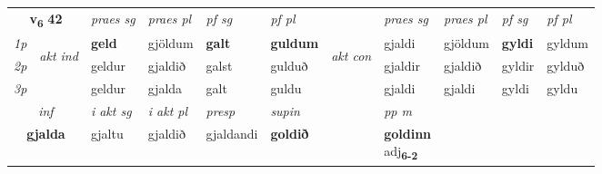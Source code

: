 \noindent
\begin{tabular}{lllllllllll} \toprule
\multicolumn{2}{c}{\textbf{v{\textsubscript{6}}} \Large{\textbf{42}}}  &  \textit{praes sg}  & \textit{praes pl}  &\textit{ pf sg} & \textit{pf pl} &  &  \textit{praes sg}  & \textit{praes pl}  & \textit{pf sg} & \textit{pf pl } \\*
	\cmidrule{3-6} \cmidrule{8-11}
 {\textit{1p}} & \multirow{3}{*}{\begin{turn}{90}\textit{akt ind}\end{turn}} & \textbf{geld} & gjöldum & \textbf{galt} & \textbf{guldum} & \multirow{3}{*}{\begin{turn}{90}\textit{akt con}\end{turn}} &gjaldi & gjöldum & \textbf{gyldi} & gyldum\\*
 {\textit{2p}} &  &  geldur  & gjaldið & galst & gulduð & & gjaldir & gjaldið & gyldir & gylduð \\*
{\textit{3p}} &  & geldur & gjalda & galt & guldu & & gjaldi & gjaldi& gyldi & gyldu \\*
\cmidrule{3-6} \cmidrule{8-11}

   \multicolumn{2}{c}{\textit{inf}}  & \textit{i akt sg} & \textit{i akt pl}   & \textit{presp} & \textit{supin}  && \textit{pp m} \\*
  \multicolumn{2}{c}{\textbf{gjalda}} & gjaltu  & gjaldið   & gjaldandi &  \textbf{goldið}  && \specialcell{\textbf{goldinn} \\ adj\textbf{\textsubscript{6-2}}} \\*
\end{tabular}

